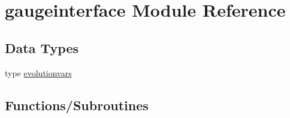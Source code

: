\hypertarget{namespacegaugeinterface}{}\section{gaugeinterface Module Reference}
\label{namespacegaugeinterface}
\subsection*{Data Types}
\begin{DoxyCompactItemize}
\item 
type \mbox{\hyperlink{structgaugeinterface_1_1evolutionvars}{evolutionvars}}
\end{DoxyCompactItemize}
\subsection*{Functions/\+Subroutines}
